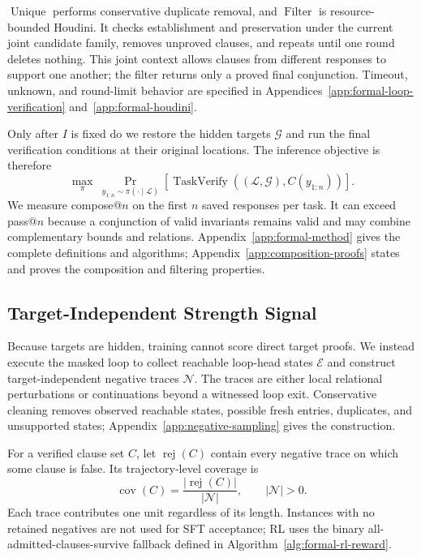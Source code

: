 \(\operatorname{Unique}\) performs conservative duplicate removal, and
\(\operatorname{Filter}\) is resource-bounded Houdini.  It checks
establishment and preservation under the current joint candidate family,
removes unproved clauses, and repeats until one round deletes nothing.  This
joint context allows clauses from different responses to support one another;
the filter returns only a proved final conjunction.  Timeout, unknown, and
round-limit behavior are specified in Appendices~\ref{app:formal-loop-verification}
and~\ref{app:formal-houdini}.

Only after \(I\) is fixed do we restore the hidden targets \(\mathcal G\)
and run the final verification conditions at their original locations.  The
inference objective is therefore
\[
  \max_\pi\ \Pr_{y_{1:n}\sim\pi(\cdot\mid\mathcal L)}
  [\operatorname{TaskVerify}((\mathcal L,\mathcal G),C(y_{1:n}))].
\]
We measure compose@\(n\) on the first \(n\) saved responses per task.  It can
exceed pass@\(n\) because a
conjunction of valid invariants remains valid and may combine complementary
bounds and relations.  Appendix~\ref{app:formal-method} gives the complete
definitions and algorithms; Appendix~\ref{app:composition-proofs} states and
proves the composition and filtering properties.

\subsection{Target-Independent Strength Signal}
\label{sec:method:sampler}

Because targets are hidden, training cannot score direct target proofs.  We
instead execute the masked loop to collect reachable loop-head states
\(\mathcal E\) and construct target-independent negative traces
\(\mathcal N\).  The traces are either local relational perturbations or
continuations beyond a witnessed loop exit.  Conservative cleaning removes
observed reachable states, possible fresh entries, duplicates, and unsupported
states; Appendix~\ref{app:negative-sampling} gives the construction.

For a verified clause set \(C\), let \(\operatorname{rej}(C)\) contain every
negative trace on which some clause is false.  Its trajectory-level coverage
is
\begin{equation}
  \operatorname{cov}(C)=
  \frac{|\operatorname{rej}(C)|}{|\mathcal N|},
  \qquad |\mathcal N|>0.
  \label{eq:method-coverage}
\end{equation}
Each trace contributes one unit regardless of its length.  Instances with no
retained negatives are not used for SFT acceptance; RL uses the binary
all-admitted-clauses-survive fallback defined in
Algorithm~\ref{alg:formal-rl-reward}.

